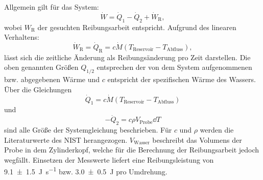 	Allgemein gilt für das System:
	\begin{equation} \label{eq:W}%
		\dot{W} = \dot{Q}_1 - \dot{Q}_2 + \dot{W}_\text{R},
	\end{equation} %
	wobei $W_\text{R}$ der gesuchten Reibungsarbeit entspricht.
	Aufgrund des linearen Verhaltens:
	\begin{equation} %
		\dot{W}_\text{R} = \dot{Q}_\text{R} = c \dot{M} (T_\text{Reservoir} - T_\text{Abfluss}),
	\end{equation} %
	lässt sich die zeitliche Änderung als Reibungsänderung pro Zeit darstellen.
	Die oben genannten Größen $Q_{1/2}$ entsprechen der von dem System aufgenommenen bzw. abgegebenen Wärme und $c$ entspricht der spezifischen Wärme des Wassers.
	Über die Gleichungen
	\begin{equation} %
		\dot{Q}_1 = c \dot{M} (T_\text{Reservoir} - T_\text{Abfluss})
	\end{equation} %
	und
	\begin{equation} \label{eq:Q2} %
		-\dot{Q}_2 = c \rho V_\text{Probe} \dd{T}
	\end{equation} %
	sind alle Größe der Systemgleichung beschrieben.
	Für $c$ und $\rho$ werden die Literaturwerte des NIST\cite{NISTwater} herangezogen.
	$V_\text{Wasser}$ beschreibt das Volumens der Probe in dem Zylinderkopf, welche für die Berechnung der Reibungsarbeit jedoch wegfällt.
	Einsetzen der Messwerte liefert eine Reibungsleistung von \SI{9.1+-1.5}{\joule\per\second} bzw. \SI{3.0+-0.5}{\joule} pro Umdrehung.	
	
